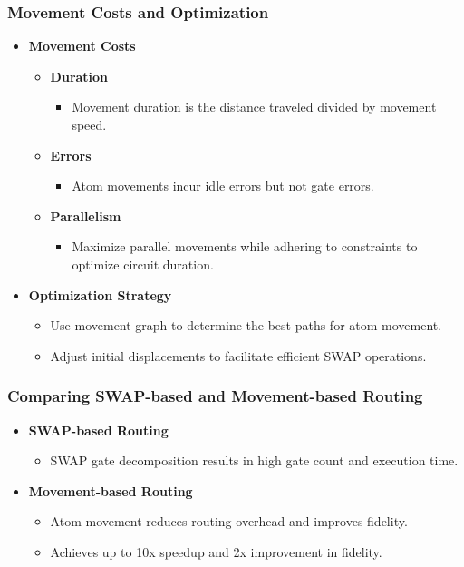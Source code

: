 \documentclass[18 pt]{beamer}
\begin{document}
\begin{frame}
    \frametitle{Movement Costs and Optimization}
    \begin{itemize}
        \item \textbf{Movement Costs}
        \begin{itemize}
            \item \textbf{Duration}
            \begin{itemize}
                \item Movement duration is the distance traveled divided by movement speed.
            \end{itemize}
            \item \textbf{Errors}
            \begin{itemize}
                \item Atom movements incur idle errors but not gate errors.
            \end{itemize}
            \item \textbf{Parallelism}
            \begin{itemize}
                \item Maximize parallel movements while adhering to constraints to optimize circuit duration.
            \end{itemize}
        \end{itemize}
        \item \textbf{Optimization Strategy}
        \begin{itemize}
            \item Use movement graph to determine the best paths for atom movement.
            \item Adjust initial displacements to facilitate efficient SWAP operations.
        \end{itemize}
    \end{itemize}
\end{frame}

\begin{frame}
    \frametitle{Comparing SWAP-based and Movement-based Routing}
    \begin{itemize}
        \item \textbf{SWAP-based Routing}
        \begin{itemize}
            \item SWAP gate decomposition results in high gate count and execution time.
        \end{itemize}
        \item \textbf{Movement-based Routing}
        \begin{itemize}
            \item Atom movement reduces routing overhead and improves fidelity.
            \item Achieves up to 10x speedup and 2x improvement in fidelity.
        \end{itemize}
    \end{itemize}
\end{frame}
\end{document}
